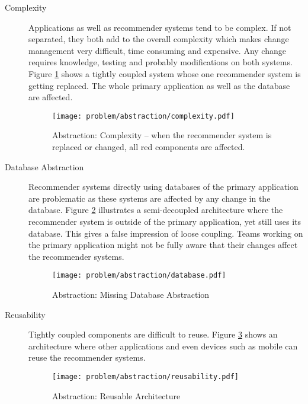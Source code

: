 \begin{description}

    \item[Complexity] Applications as well as recommender systems tend to be complex. If not separated, they both add to the overall complexity which makes change management very difficult, time consuming and expensive. Any change requires knowledge, testing and probably modifications on both systems. Figure \ref{fig:abstraction-complexity} shows a tightly coupled system whose one recommender system is getting replaced. The whole primary application as well as the database are affected.

    \begin{figure}[H]
        \texttt{[image: problem/abstraction/complexity.pdf]}
        \caption[Abstraction: Complexity]{Abstraction: Complexity -- when the recommender system is replaced or changed, all red components are affected.}
        \label{fig:abstraction-complexity}
    \end{figure}

    \item[Database Abstraction] Recommender systems directly using databases of the primary application are problematic as these systems are affected by any change in the database. Figure \ref{fig:abstraction-database} illustrates a semi-decoupled architecture where the recommender system is outside of the primary application, yet still uses its database. This gives a false impression of loose coupling. Teams working on the primary application might not be fully aware that their changes affect the recommender systems.

    \begin{figure}[H]
        \texttt{[image: problem/abstraction/database.pdf]}
        \caption{Abstraction: Missing Database Abstraction}
        \label{fig:abstraction-database}
    \end{figure}

    \item[Reusability] Tightly coupled components are difficult to reuse. Figure \ref{fig:abstraction-resuability} shows an architecture where other applications and even devices such as mobile can reuse the recommender systems.

    \begin{figure}[H]
        \texttt{[image: problem/abstraction/reusability.pdf]}
        \caption{Abstraction: Reusable Architecture}
        \label{fig:abstraction-resuability}
    \end{figure}


\end{description}
